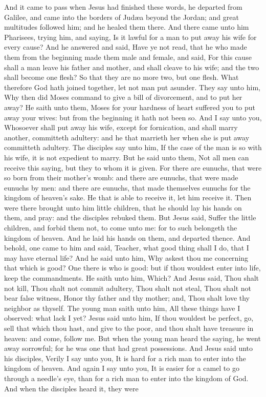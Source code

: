 And it came to pass when Jesus had finished these words, he departed from Galilee, and came into the borders of Judæa beyond the Jordan; and great multitudes followed him; and he healed them there.  And there came unto him Pharisees, trying him, and saying, Is it lawful for a man to put away his wife for every cause? And he answered and said, Have ye not read, that he who made them from the beginning made them male and female, and said, For this cause shall a man leave his father and mother, and shall cleave to his wife; and the two shall become one flesh? So that they are no more two, but one flesh. What therefore God hath joined together, let not man put asunder. They say unto him, Why then did Moses command to give a bill of divorcement, and to put her away? He saith unto them, Moses for your hardness of heart suffered you to put away your wives: but from the beginning it hath not been so. And I say unto you, Whosoever shall put away his wife, except for fornication, and shall marry another, committeth adultery: and he that marrieth her when she is put away committeth adultery. The disciples say unto him, If the case of the man is so with his wife, it is not expedient to marry. But he said unto them, Not all men can receive this saying, but they to whom it is given. For there are eunuchs, that were so born from their mother’s womb: and there are eunuchs, that were made eunuchs by men: and there are eunuchs, that made themselves eunuchs for the kingdom of heaven’s sake. He that is able to receive it, let him receive it.  Then were there brought unto him little children, that he should lay his hands on them, and pray: and the disciples rebuked them. But Jesus said, Suffer the little children, and forbid them not, to come unto me: for to such belongeth the kingdom of heaven. And he laid his hands on them, and departed thence.  And behold, one came to him and said, Teacher, what good thing shall I do, that I may have eternal life? And he said unto him, Why askest thou me concerning that which is good? One there is who is good: but if thou wouldest enter into life, keep the commandments. He saith unto him, Which? And Jesus said, Thou shalt not kill, Thou shalt not commit adultery, Thou shalt not steal, Thou shalt not bear false witness, Honor thy father and thy mother; and, Thou shalt love thy neighbor as thyself. The young man saith unto him, All these things have I observed: what lack I yet? Jesus said unto him, If thou wouldest be perfect, go, sell that which thou hast, and give to the poor, and thou shalt have treasure in heaven: and come, follow me. But when the young man heard the saying, he went away sorrowful; for he was one that had great possessions.  And Jesus said unto his disciples, Verily I say unto you, It is hard for a rich man to enter into the kingdom of heaven. And again I say unto you, It is easier for a camel to go through a needle’s eye, than for a rich man to enter into the kingdom of God. And when the disciples heard it, they were 
